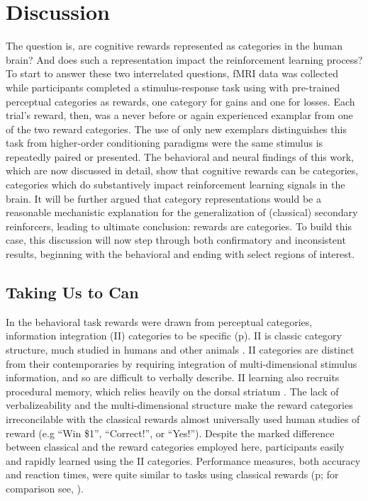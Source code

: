 \section{Discussion}
\label{sec:dicussion}
The question is, are cognitive rewards represented as categories in the human brain?  And does such a representation impact the reinforcement learning process?  To start to answer these two interrelated questions, fMRI data was collected while participants completed a stimulus-response task using with pre-trained perceptual categories as rewards, one category for gains and one for losses.  Each trial's reward, then, was a never before or again experienced examplar from one of the two reward categories.  The use of only new exemplars distinguishes this task from higher-order conditioning paradigms were the same stimulus is repeatedly paired or presented.  The behavioral and neural findings of this work, which are now discussed in detail, show that cognitive rewards can be categories, categories which do substantively impact reinforcement learning signals in the brain.  It will be further argued that category representations would be a reasonable mechanistic explanation for the generalization of (classical) secondary reinforcers, leading to ultimate conclusion: rewards are categories.  To build this case, this discussion will now step through both confirmatory and inconsistent results, beginning with the behavioral and ending with select regions of interest.

\subsection{Taking Us to Can}
\label{sub:tocan}
In the behavioral task rewards were drawn from perceptual categories, information integration (II) categories to be specific (p\pageref{subsub:whatwhen}).  II is classic category structure, much studied in humans and other animals \cite{Smith:2011p9101,Ashby:2011p9148,Smith:2010p9713}.  II categories are distinct from their contemporaries by requiring integration of multi-dimensional stimulus information, and so are difficult to verbally describe. II learning also recruits procedural memory, which relies heavily on the dorsal striatum \cite{Ashby:1998p9716}.   The lack of verbalizeability and the multi-dimensional structure make the reward categories irreconcilable with the classical rewards almost universally used human studies of reward (e.g ``Win \$1'', ``Correct!'', or ``Yes!'').  Despite the marked difference between classical and the reward categories employed here, participants easily and rapidly learned using the II categories.  Performance measures, both accuracy and reaction times, were quite similar to tasks using classical rewards (p\pageref{subsub:wellbehaved}; for comparison see, ).

